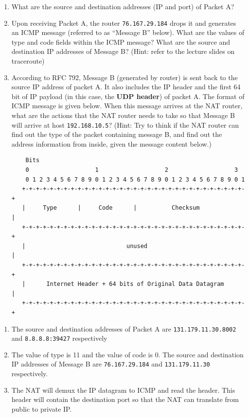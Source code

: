 \documentclass{report}
\begin{document}
\begin{problem}
\begin{enumerate}
\item What are the source and destination addresses (IP and port) of Packet A?
\item Upon receiving Packet A, the router \texttt{76.167.29.184} drops it and generates an ICMP message (referred to as ``Message B'' below). What are the values of type and code fields within the ICMP message? What are the source and destination IP addresses of Message B? (Hint: refer to the lecture slides on traceroute)
\item According to RFC 792, Message B (generated by router) is sent back to the source IP address of packet A. It also includes the IP header and the first 64 bit of IP payload (in this case, the \textbf{UDP header}) of packet A. The format of ICMP message is given below. When this message arrives at the NAT router, what are the actions that the NAT router needs to take so that Message B will arrive at host \texttt{192.168.10.5}? (Hint: Try to think if the NAT router can find out the type of the packet containing message B, and find out the address information from inside, given the message content below.)
\begin{verbatim}
    Bits
    0                   1                   2                   3
    0 1 2 3 4 5 6 7 8 9 0 1 2 3 4 5 6 7 8 9 0 1 2 3 4 5 6 7 8 9 0 1
   +-+-+-+-+-+-+-+-+-+-+-+-+-+-+-+-+-+-+-+-+-+-+-+-+-+-+-+-+-+-+-+-+
   |     Type      |     Code      |          Checksum             |
   +-+-+-+-+-+-+-+-+-+-+-+-+-+-+-+-+-+-+-+-+-+-+-+-+-+-+-+-+-+-+-+-+
   |                             unused                            |
   +-+-+-+-+-+-+-+-+-+-+-+-+-+-+-+-+-+-+-+-+-+-+-+-+-+-+-+-+-+-+-+-+
   |      Internet Header + 64 bits of Original Data Datagram      |
   +-+-+-+-+-+-+-+-+-+-+-+-+-+-+-+-+-+-+-+-+-+-+-+-+-+-+-+-+-+-+-+-+
\end{verbatim}
\end{enumerate}

\begin{answer}{40em}
    \begin{enumerate}
        \item The source and destination addresses of Packet A are \texttt{131.179.11.30.8002} and 
            \texttt{8.8.8.8:39427} respectively
        \item The value of type is 11 and the value of code is 0. The source and destination IP addresses
            of Message B are \texttt{76.167.29.184} and \texttt{131.179.11.30} respectively.
        \item The NAT will demux the IP datagram to ICMP and read the header. This header will
            contain the destination port so that the NAT can translate from public to private IP.
    \end{enumerate}
\end{answer}
\end{problem}
\end{document}
